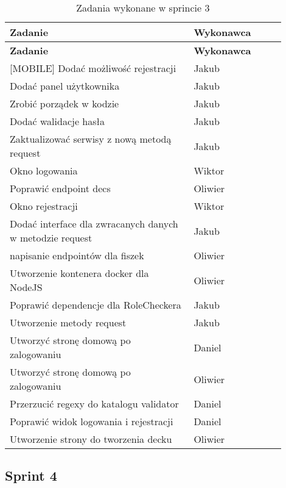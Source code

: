 \begin{longtable}{|p{0.6\linewidth}|p{0.3\linewidth}|}
\hline
\textbf{Zadanie} & \textbf{Wykonawca} \\
\hline
\endfirsthead

\hline
\textbf{Zadanie} & \textbf{Wykonawca} \\
\hline
\endhead

\hline
\endfoot

\hline
\caption{Zadania wykonane w sprincie 3}
\endlastfoot

[MOBILE] Dodać możliwość rejestracji & Jakub \\
\hline
[MOBILE] Dodać panel użytkownika & Jakub \\
\hline
[MOBILE] Zrobić porządek w kodzie & Jakub \\
\hline
[MOBILE] Dodać walidacje hasła & Jakub \\
\hline
[MOBILE] Zaktualizować serwisy z nową metodą request & Jakub \\
\hline
[WEB] Okno logowania & Wiktor \\
\hline
[BACKEND] Poprawić endpoint decs & Oliwier \\
\hline
[WEB] Okno rejestracji & Wiktor \\
\hline
[MOBILE] Dodać interface dla zwracanych danych w metodzie request & Jakub \\
\hline
[BACKEND] napisanie endpointów dla fiszek & Oliwier \\
\hline
[WEB] Utworzenie kontenera docker dla NodeJS & Oliwier \\
\hline
[BACKEND] Poprawić dependencje dla RoleCheckera & Jakub \\
\hline
[MOBILE] Utworzenie metody request & Jakub \\
\hline
[MOBILE] Utworzyć stronę domową po zalogowaniu & Daniel \\
\hline
[WEB] Utworzyć stronę domową po zalogowaniu & Oliwier \\
\hline
[MOBILE] Przerzucić regexy do katalogu validator & Daniel \\
\hline
[MOBILE] Poprawić widok logowania i rejestracji & Daniel \\
\hline
[WEB] Utworzenie strony do tworzenia decku & Oliwier \\
\hline

\end{longtable}

\subsection{Sprint 4}

